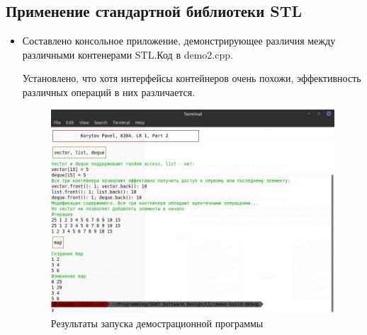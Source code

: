 \documentclass[a4paper, 14pt]{extarticle}
\begin{document}
\subsection{Применение стандартной библиотеки STL}
\begin{itemize}
    \item Составлено консольное приложение, демонстрирующее различия между различными контенерами STL.\@ Код в demo2.cpp.
    
    Установлено, что хотя интерфейсы контейнеров очень похожи, эффективность различных операций в них различается.

    \begin{figure}[h]
        \centering
        \includegraphics[width=\textwidth]{./img/S010.jpg}
        \caption{Результаты запуска демострационной программы}%
        \label{img:stl:demo}
    \end{figure}


\end{itemize}
\end{document}
